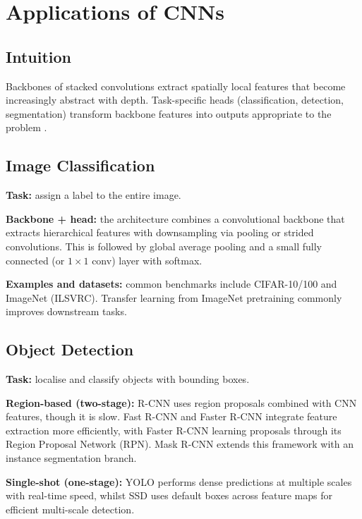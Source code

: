 
\section{Applications of CNNs }
\label{sec:cnn-applications}

\subsection*{Intuition}
Backbones of stacked convolutions extract spatially local features that become increasingly abstract with depth. Task-specific heads (classification, detection, segmentation) transform backbone features into outputs appropriate to the problem \cite{GoodfellowEtAl2016,Prince2023}.
\subsection{Image Classification}

\textbf{Task:} assign a label to the entire image.

\textbf{Backbone + head:} the architecture combines a convolutional backbone that extracts hierarchical features with downsampling via pooling or strided convolutions. This is followed by global average pooling and a small fully connected (or $1\times1$ conv) layer with softmax.

\textbf{Examples and datasets:} common benchmarks include CIFAR-10/100 and ImageNet (ILSVRC). Transfer learning from ImageNet pretraining commonly improves downstream tasks.

\subsection{Object Detection}

\textbf{Task:} localise and classify objects with bounding boxes.

\textbf{Region-based (two-stage):} R-CNN uses region proposals combined with CNN features, though it is slow. Fast R-CNN and Faster R-CNN integrate feature extraction more efficiently, with Faster R-CNN learning proposals through its Region Proposal Network (RPN). Mask R-CNN extends this framework with an instance segmentation branch.

\textbf{Single-shot (one-stage):} YOLO performs dense predictions at multiple scales with real-time speed, whilst SSD uses default boxes across feature maps for efficient multi-scale detection.

